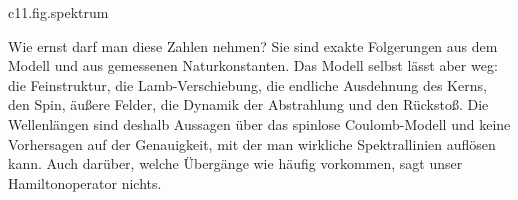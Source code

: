 \begin{tpcfigure}{c11.fig.spektrum}
  \caption{Dieselben Übergänge als Wellenlängen nach \eqref{c11.eq.linie}, auf einer
    logarithmischen Achse. Jeder Strich ist eine Linie; durchgezogen die Lyman-Serie
    ($\nqn = 2, \ldots, 12$), gestrichelt die Balmer-Serie ($\nqn = 3, \ldots, 12$). So
    wie sich die Niveaus bei $E = 0$ häufen, drängen sich die Linien jeder Serie an
    ihrer Seriengrenze, der Wellenlänge für $\nqn \to \infty$. Zwischen den beiden
    Serien liegt keine Linie von einer der beiden.}
\end{tpcfigure}

Wie ernst darf man diese Zahlen nehmen? Sie sind exakte Folgerungen aus dem Modell und
aus gemessenen Naturkonstanten. Das Modell selbst lässt aber weg: die
Feinstruktur, die Lamb-Verschiebung, die endliche Ausdehnung des Kerns, den Spin, äußere
Felder, die Dynamik der Abstrahlung und den Rückstoß. Die Wellenlängen sind deshalb
Aussagen über das spinlose Coulomb-Modell und keine Vorhersagen auf der Genauigkeit, mit
der man wirkliche Spektrallinien auflösen kann. Auch darüber, welche Übergänge wie
häufig vorkommen, sagt unser Hamiltonoperator nichts.

